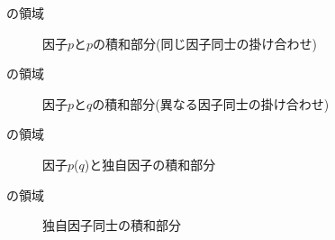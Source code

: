 \begin{description}
	\item[の領域] 因子$p$と$p$の積和部分(同じ因子同士の掛け合わせ)
	\item[の領域] 因子$p$と$q$の積和部分(異なる因子同士の掛け合わせ)
	\item[の領域] 因子$p$($q$)と独自因子の積和部分
	\item[の領域] 独自因子同士の積和部分
\end{description}
